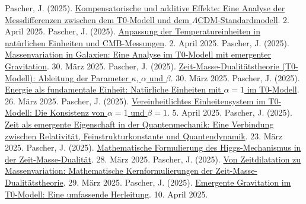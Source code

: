 \documentclass[12pt,a4paper]{article}
\begin{document}
	\begin{thebibliography}{99}
		 Pascher, J. (2025). \href{https://github.com/jpascher/T0-Time-Mass-Duality/tree/main/2/pdf/Deutsch/MessdifferenzenT0Standard.pdf}{Kompensatorische und additive Effekte: Eine Analyse der Messdifferenzen zwischen dem T0-Modell und dem \(\Lambda\)CDM-Standardmodell}. 2. April 2025.
		 Pascher, J. (2025). \href{https://github.com/jpascher/T0-Time-Mass-Duality/tree/main/2/pdf/Deutsch/NatEinheitenAlpha1.pdf}{Anpassung der Temperatureinheiten in natürlichen Einheiten und CMB-Messungen}. 2. April 2025.
		 Pascher, J. (2025). \href{https://github.com/jpascher/T0-Time-Mass-Duality/tree/main/2/pdf/Deutsch/MassVarGalaxien.pdf}{Massenvariation in Galaxien: Eine Analyse im T0-Modell mit emergenter Gravitation}. 30. März 2025.
		 Pascher, J. (2025). \href{https://github.com/jpascher/T0-Time-Mass-Duality/tree/main/2/pdf/Deutsch/ZeitMasseT0Params.pdf}{Zeit-Masse-Dualitätstheorie (T0-Modell): Ableitung der Parameter \(\kappa\), \(\alpha\) und \(\beta\)}. 30. März 2025.
		 Pascher, J. (2025). \href{https://github.com/jpascher/T0-Time-Mass-Duality/tree/main/2/pdf/Deutsch/NatEinheitenAlpha1.pdf}{Energie als fundamentale Einheit: Natürliche Einheiten mit \(\alpha = 1\) im T0-Modell}. 26. März 2025.
		 Pascher, J. (2025). \href{https://github.com/jpascher/T0-Time-Mass-Duality/tree/main/2/pdf/Deutsch/Alpha1Beta1Konsistenz.pdf}{Vereinheitlichtes Einheitensystem im T0-Modell: Die Konsistenz von \(\alpha = 1\) und \(\beta = 1\)}. 5. April 2025.
		 Pascher, J. (2025). \href{https://github.com/jpascher/T0-Time-Mass-Duality/tree/main/2/pdf/Deutsch/NatEinheitenAlpha1.pdf}{Zeit als emergente Eigenschaft in der Quantenmechanik: Eine Verbindung zwischen Relativität, Feinstrukturkonstante und Quantendynamik}. 23. März 2025.
		 Pascher, J. (2025). \href{https://github.com/jpascher/T0-Time-Mass-Duality/tree/main/2/pdf/Deutsch/MathHiggsZeitMasse.pdf}{Mathematische Formulierung des Higgs-Mechanismus in der Zeit-Masse-Dualität}. 28. März 2025.
		 Pascher, J. (2025). \href{https://github.com/jpascher/T0-Time-Mass-Duality/tree/main/2/pdf/Deutsch/MathZeitMasseLagrange.pdf}{Von Zeitdilatation zu Massenvariation: Mathematische Kernformulierungen der Zeit-Masse-Dualitätstheorie}. 29. März 2025.
		 Pascher, J. (2025). \href{https://github.com/jpascher/T0-Time-Mass-Duality/tree/main/2/pdf/Deutsch/EmergentGravT0.pdf}{Emergente Gravitation im T0-Modell: Eine umfassende Herleitung}. 10. April 2025.

\end{thebibliography}
\end{document}
